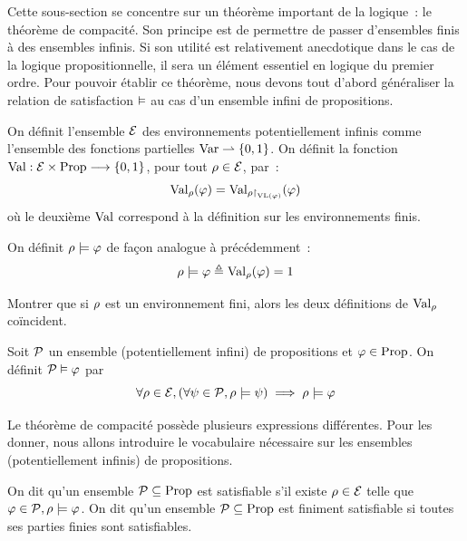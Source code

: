 Cette sous-section se concentre sur un théorème important de la logique~: le
théorème de compacité. Son principe est de permettre de passer d'ensembles finis
à des ensembles infinis. Si son utilité est relativement anecdotique dans le cas
de la logique propositionnelle, il sera un élément essentiel en logique du
premier ordre. Pour pouvoir établir ce théorème, nous devons tout d'abord
généraliser la relation de satisfaction $\vDash$ au cas d'un ensemble infini de
propositions.

\begin{definition}
  On définit l'ensemble $\mathcal E$ des environnements potentiellement infinis
  comme l'ensemble des fonctions partielles $\operatorname{Var} \rightharpoonup \{0,1\}$. On
  définit la
  fonction $\operatorname{Val} : \displaystyle \mathcal E\times \operatorname{Prop} \longrightarrow \{0,1\}$, pour tout
  $\rho\in\mathcal E$, par~:
  \[\operatorname{Val}_\rho(\varphi) = \operatorname{Val}_{\rho\mathbin{\upharpoonright}_{\operatorname{VL}(\varphi)}}(\varphi)\]
  où le deuxième $\operatorname{Val}$ correspond à la définition sur les environnements finis.

  On définit $\rho\models \varphi$ de façon analogue à précédemment~:
  \[\rho\models \varphi \triangleq \operatorname{Val}_{\rho}(\varphi) = 1\]
\end{definition}

\begin{exercise}
  Montrer que si $\rho$ est un environnement fini, alors les deux définitions de
  $\operatorname{Val}_{\rho}$ coïncident.
\end{exercise}

\begin{definition}
  Soit $\mathcal P$ un ensemble (potentiellement infini) de propositions et
  $\varphi\in\operatorname{Prop}$. On définit $\mathcal P\vDash \varphi$ par
  \[\forall \rho\in\mathcal E, (\forall \psi \in\mathcal P, \rho\models \psi)
  \implies \rho\models \varphi\]
\end{definition}

Le théorème de compacité possède plusieurs expressions différentes. Pour les
donner, nous allons introduire le vocabulaire nécessaire sur les ensembles
(potentiellement infinis) de propositions.

\begin{definition}[Satisfiabilité]
  On dit qu'un ensemble $\mathcal P\subseteq\operatorname{Prop}$ est satisfiable s'il existe
  $\rho\in\mathcal E$ telle que $\varphi\in\mathcal P, \rho\models \varphi$. On dit
  qu'un ensemble $\mathcal P\subseteq\operatorname{Prop}$ est finiment satisfiable si toutes
  ses parties finies sont satisfiables.
\end{definition}

